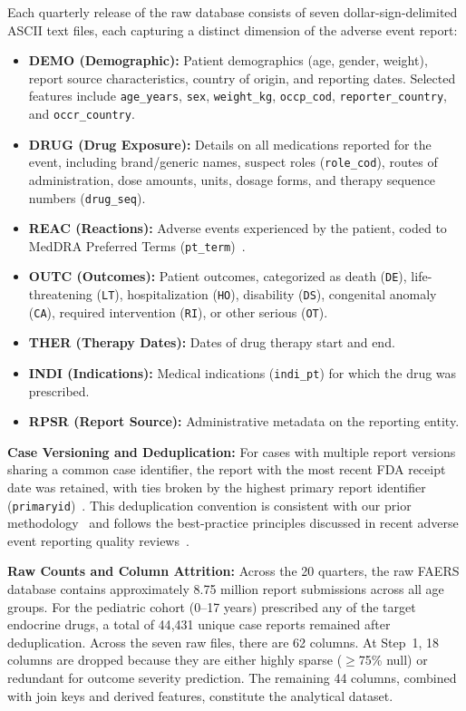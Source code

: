 \documentclass[10pt,twocolumn]{article}
\newcommand{\FAERS}{\textsf{FAERS}\xspace}
\begin{document}
Each quarterly release of the raw database consists of seven dollar-sign-delimited ASCII text files, each capturing a distinct dimension of the adverse event report:
\begin{itemize}[leftmargin=*]
\item \textbf{DEMO (Demographic):} Patient demographics (age, gender, weight), report source characteristics, country of origin, and reporting dates. Selected features include \texttt{age\_years}, \texttt{sex}, \texttt{weight\_kg}, \texttt{occp\_cod}, \texttt{reporter\_country}, and \texttt{occr\_country}.
\item \textbf{DRUG (Drug Exposure):} Details on all medications reported for the event, including brand/generic names, suspect roles (\texttt{role\_cod}), routes of administration, dose amounts, units, dosage forms, and therapy sequence numbers (\texttt{drug\_seq}).
\item \textbf{REAC (Reactions):} Adverse events experienced by the patient, coded to MedDRA Preferred Terms (\texttt{pt\_term})~\cite{meddra2023}.
\item \textbf{OUTC (Outcomes):} Patient outcomes, categorized as death (\texttt{DE}), life-threatening (\texttt{LT}), hospitalization (\texttt{HO}), disability (\texttt{DS}), congenital anomaly (\texttt{CA}), required intervention (\texttt{RI}), or other serious (\texttt{OT}).
\item \textbf{THER (Therapy Dates):} Dates of drug therapy start and end.
\item \textbf{INDI (Indications):} Medical indications (\texttt{indi\_pt}) for which the drug was prescribed.
\item \textbf{RPSR (Report Source):} Administrative metadata on the reporting entity.
\end{itemize}
 
\textbf{Case Versioning and Deduplication:} For cases with multiple report versions sharing a common case identifier, the report with the most recent FDA receipt date was retained, with ties broken by the highest primary report identifier (\texttt{primaryid})~\cite{fda2026}. This deduplication convention is consistent with our prior methodology~\cite{telkar2026obesity} and follows the best-practice principles discussed in recent adverse event reporting quality reviews~\cite{misu2023}.
 
\textbf{Raw Counts and Column Attrition:} Across the 20 quarters, the raw \FAERS database contains approximately 8.75 million report submissions across all age groups. For the pediatric cohort (0--17 years) prescribed any of the target endocrine drugs, a total of 44{,}431 unique case reports remained after deduplication. Across the seven raw files, there are 62 columns. At Step~1, 18 columns are dropped because they are either highly sparse (${\geq}$75\% null) or redundant for outcome severity prediction. The remaining 44 columns, combined with join keys and derived features, constitute the analytical dataset.
 
\end{document}
